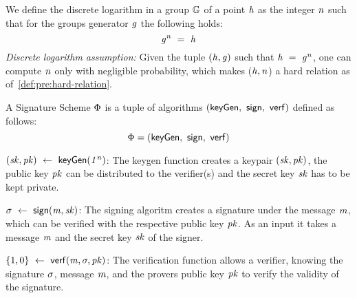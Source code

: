 \begin{definition}\label{def:pre:discretelog}
    We define the discrete logarithm in a group $\mathbb{G}$ of a point $\mathit{h}$ as the integer $\mathit{n}$ such that for the groups generator $\mathit{g}$ the following holds:
    \[ \mathit{g}^{\mathit{n}} ~=~ \mathit{h} \]
    \textit{Discrete logarithm assumption:} Given the tuple $(\mathit{h},\mathit{g})$ such that $\mathit{h} ~=~ \mathit{g}^{\mathit{n}}$, one can compute $\mathit{n}$ only with negligible probability, which makes ($\mathit{h}, \mathit{n}$) a hard relation as of~\cref{def:pre:hard-relation}.
\end{definition}

\begin{definition}\label{def:pre:signature-scheme}
    A Signature Scheme $\Phi$ is a tuple of algorithms $(\mathsf{keyGen} ,~ \mathsf{sign} ,~ \mathsf{verf})$ defined as follows:
    \[ \Phi = (\mathsf{keyGen} ,~ \mathsf{sign} ,~ \mathsf{verf}) \]

    \begin{asparaitem}
        \item $(\mathit{sk}, \mathit{pk}) ~\leftarrow~ \mathsf{keyGen}(\mathit{1^n})$: The keygen function creates a keypair $(\mathit{sk}, \mathit{pk})$, the public key $\mathit{pk}$ can be distributed to the verifier(s) and the secret key $\mathit{sk}$ has to be kept private. \\
        \item $\sigma ~\leftarrow~ \mathsf{sign}(\mathit{m}, \mathit{sk})$: The signing algoritm creates a signature under the message $\mathit{m}$, which can be verified with the respective public key $\mathit{pk}$.
        As an input it takes a message $\mathit{m}$ and the secret key $\mathit{sk}$ of the signer.
        \item $\{1,0\} ~\leftarrow~ \mathsf{verf}(\mathit{m}, \sigma, \mathit{pk})$: The verification function allows a verifier, knowing the signature $\sigma$, message $\mathit{m}$, and the provers public key $\mathit{pk}$ to verify the validity of the signature.
    \end{asparaitem}


\end{definition}
